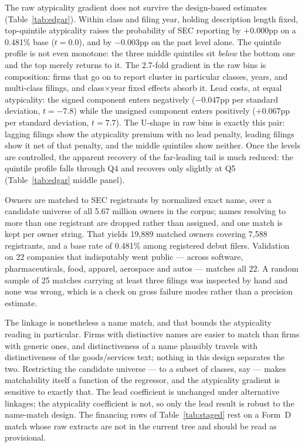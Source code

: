 The raw atypicality gradient does not survive the design-based estimates (Table~\ref{tab:edgar}). Within class and filing year, holding description length
fixed, top-quintile atypicality raises the probability of SEC reporting by
$+0.000$pp on a 0.481\% base ($t = 0.0$), and by $-0.003$pp on the past
level alone. The quintile profile is not even monotone: the three middle
quintiles sit \emph{below} the bottom one and the top merely returns to it.
The 2.7-fold gradient in the raw bins is composition: firms that go on to
report cluster in particular classes, years, and multi-class filings, and
class$\times$year fixed effects absorb it. Lead costs, at equal
atypicality: the signed component enters negatively
($-0.047$pp per standard deviation, $t = -7.8$) while the unsigned component enters
positively ($+0.067$pp per standard deviation, $t = 7.7$). The U-shape in raw bins
is exactly this pair: lagging filings show the atypicality premium with no
lead penalty, leading filings show it net of that penalty, and the middle
quintiles show neither. Once the levels are controlled,
the apparent recovery of the far-leading tail is much reduced: the quintile
profile falls through Q4 and recovers only slightly at Q5
(Table~\ref{tab:edgar} middle panel).

Owners are matched to SEC
registrants by normalized exact name, over a candidate universe of all
5.67 million owners in the corpus; names resolving to more than one
registrant are dropped rather than assigned, and one match is kept per owner
string. That yields 19{,}889 matched owners covering 7{,}588 registrants, and
a base rate of 0.481\% among registered debut filers. Validation on 22
companies that indisputably went public --- across software,
pharmaceuticals, food, apparel, aerospace and autos --- matches all 22. A random sample of 25 matches
carrying at least three filings was inspected by hand and none was wrong,
which is a check on gross failure modes rather than a precision estimate.

The linkage is nonetheless a name match, and that bounds the atypicality
reading in particular. Firms with distinctive names are easier to match than
firms with generic ones, and distinctiveness of a name plausibly travels with
distinctiveness of the goods/services text; nothing in this design separates
the two. Restricting the candidate universe --- to a subset of classes, say
--- makes matchability itself a function of the regressor, and the
atypicality gradient is sensitive to exactly that. The lead coefficient is
unchanged under alternative linkages; the atypicality coefficient is not,
so only the lead result is robust to the name-match design. The financing
rows of Table~\ref{tab:staged} rest on a Form~D match whose raw extracts are
not in the current tree and should be read as provisional.

